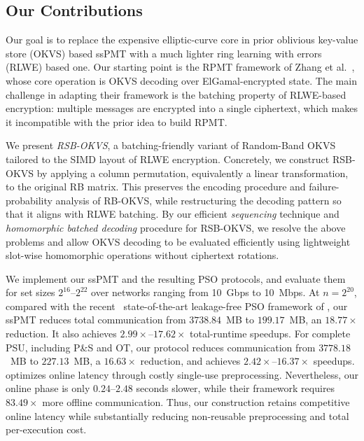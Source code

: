 \subsection{Our Contributions}
Our goal is to replace the expensive elliptic-curve core in prior oblivious key-value store (OKVS) based ssPMT with a much lighter ring learning with errors (RLWE) based one. 
Our starting point is the RPMT framework of Zhang et al.~\cite{ZCL+23}, whose core operation is OKVS decoding over ElGamal-encrypted state. 
The main challenge in adapting their framework is the batching property of RLWE-based encryption: multiple messages are encrypted into a single ciphertext, which makes it incompatible with the prior idea to build RPMT.

We present \emph{RSB-OKVS}, a batching-friendly variant of Random-Band OKVS~\cite{BPSY23} tailored to the SIMD layout of RLWE encryption. 
Concretely, we construct RSB-OKVS by applying a column permutation, equivalently a linear transformation, to the original RB matrix. This preserves the encoding procedure and failure-probability analysis of RB-OKVS, while restructuring the decoding pattern so that it aligns with RLWE batching.
By our efficient \emph{sequencing} technique and  \emph{homomorphic batched decoding} procedure for RSB-OKVS, we resolve the above problems and allow OKVS decoding to be evaluated efficiently using lightweight slot-wise homomorphic operations without ciphertext rotations. 

We implement our ssPMT and the resulting PSO protocols, and evaluate them for set sizes $2^{16}$--$2^{22}$ over networks ranging from 10~Gbps to 10~Mbps. 
At $n=2^{20}$, compared with the recent ~state-of-the-art leakage-free PSO framework of \cite{WCS+26}, our ssPMT reduces total communication from $3738.84$~MB to $199.17$~MB, an $18.77\times$ reduction. It also achieves $2.99\times$--$17.62\times$ total-runtime speedups. For complete PSU, including P\&S and OT, our protocol reduces communication from $3778.18$~MB to $227.13$~MB, a $16.63\times$ reduction, and achieves $2.42\times$--$16.37\times$ speedups. \cite{WCS+26} optimizes online latency through costly single-use preprocessing. Nevertheless, our online phase is only $0.24$--$2.48$ seconds slower, while their framework requires $83.49\times$ more offline communication. Thus, our construction retains competitive online latency while substantially reducing non-reusable preprocessing and total per-execution cost.

